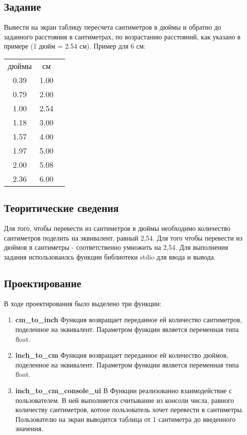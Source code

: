 \documentclass[12pt,a4paper]{report}
\begin{document}
\subsection{Задание}
\hspace{\parindent}
Вывести на экран таблицу пересчета сантиметров в дюймы и обратно до заданного расстояния в сантиметрах, по возрастанию расстояний, как указано в примере (1 дюйм = 2.54 см). Пример для 6 см:
	
\begin{center}
\begin{tabular}{ccc}
	дюймы  &  см \\
	0.39 &  1.00 \\
	0.79 &  2.00 \\
	1.00 &  2.54 \\
	1.18 &  3.00 \\
	1.57 &  4.00 \\
	1.97 &  5.00 \\
	2.00 &  5.08 \\
	2.36 &  6.00\\
\end{tabular}
\end{center}	
	
\subsection{Теоритические сведения}
\hspace{\parindent}
Для того, чтобы перевести из сантиметров в дюймы необходимо количество сантиметров поделить на эквивалент, равный 2,54. Для того чтобы перевести из дюймов в сантиметры - соответственно умножить на 2,54.
	Для выполнения задания использоваилсь функции библиотеки stdio для ввода и вывода.
	
\subsection{Проектирование}
\hspace{\parindent}
В ходе проектирования было выделено три функции:
\begin{enumerate}
	\item \textbf{cm\_to\_inch}
	Функция возвращает переданное ей количество сантиметров, поделенное на эквивалент.
	Параметром функции является переменная типа float.
	\item \textbf{inch\_to\_cm}
	Функция возвращает переданное ей количество дюймов, поделенное на эквивалент.
	Параметром функции является переменная типа float.	
	\item \textbf{inch\_to\_cm\_console\_ui}
	В  Функции реализованно взаимодействие с пользователем. В ней выполняется считывание из консоли числа, равного количеству сантиметров, котоое пользователь хочет перевести в сантиметры. Пользователю на экран выводится таблица от 1 сантиметра до введенного значения.	
\end{enumerate}
\end{document}
